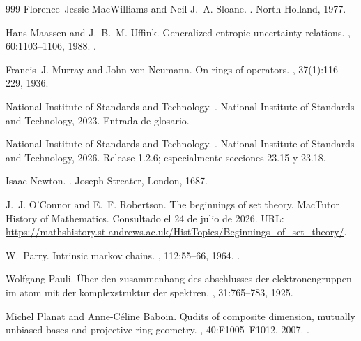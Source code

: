 \begin{thebibliography}{999}
Florence~Jessie MacWilliams and Neil J.~A. Sloane.
.
\newblock North-Holland, 1977.

Hans Maassen and J.~B.~M. Uffink.
\newblock Generalized entropic uncertainty relations.
, 60:1103--1106, 1988.
\newblock \href {https://doi.org/10.1103/PhysRevLett.60.1103}
  {}.

Francis~J. Murray and John von Neumann.
\newblock On rings of operators.
, 37(1):116--229, 1936.

{National Institute of Standards and Technology}.
.
\newblock National Institute of Standards and Technology, 2023.
\newblock Entrada de glosario.

{National Institute of Standards and Technology}.
.
\newblock National Institute of Standards and Technology, 2026.
\newblock Release 1.2.6; especialmente secciones 23.15 y 23.18.

Isaac Newton.
.
\newblock Joseph Streater, London, 1687.

J.~J. O'Connor and E.~F. Robertson.
\newblock The beginnings of set theory.
\newblock MacTutor History of Mathematics.
\newblock Consultado el 24 de julio de 2026.
\newblock URL:
  \url{https://mathshistory.st-andrews.ac.uk/HistTopics/Beginnings_of_set_theory/}.

W.~Parry.
\newblock Intrinsic markov chains.
, 112:55--66,
  1964.
\newblock \href {https://doi.org/10.1090/S0002-9947-1964-0161372-1}
  {}.

Wolfgang Pauli.
\newblock Über den zusammenhang des abschlusses der elektronengruppen im atom
  mit der komplexstruktur der spektren.
, 31:765--783, 1925.

Michel Planat and Anne-C{\'e}line Baboin.
\newblock Qudits of composite dimension, mutually unbiased bases and projective
  ring geometry.
,
  40:F1005--F1012, 2007.
\newblock \href {https://arxiv.org/abs/0709.2623} {}.


\end{thebibliography}
